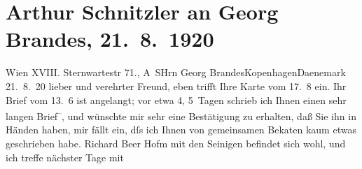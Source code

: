 

         
         \renewcommand{\erwaehntePersonen}{Personen: Richard Beer-Hofmann, Georg Brandes, Hugo von Hofmannsthal, Felix Salten}
         \renewcommand{\erwaehnteOrte}{Orte: Bad Aussee, Dänemark, Kopenhagen, Sternwartestraße, Wien, XVIII., Währing}
         \renewcommand{\erwaehnteWerke}{}
               \section[Arthur Schnitzler an Georg Brandes, 21. 8. 1920]{ Arthur Schnitzler an Georg Brandes, 21. 8. 1920}\nopagebreak{}\rehead{ }\begin{ledgroupsized}[t]{13cm}\normalsize\beginnumbering \toendnotes[C]{\smallbreak\pagebreak[2]} 
\pstart{}{\pb}Wien XVIII. Sternwartestr 71., A S\pend{}{\bigskip}\pstart{}Hrn Georg Brandes\pend{}\pstart{}Kopenhagen\pend{}\pstart{}Daenemark\pend{}{\bigskip}\pstart
           \raggedleft{}{\pb}21. 8. 20\pend
           \pstart
           lieber und verehrter Freund, eben trifft Ihre Karte vom
                  17. 8 ein. Ihr Brief vom 13. 6 ist angelangt; vor etwa
               4, 5 Tagen schrieb ich Ihnen einen sehr langen Brief\substVorne{}\textsuperscript{–}\substDazwischen{},\substHinten{} und wünschte mir sehr eine Bestätigung zu erhalten, daß Sie ihn in Händen
               haben, mir fällt ein, dſs ich Ihnen von gemeinsamen Beka{\geminationn}ten kaum etwas geschrieben habe. Richard Beer
                  Hofm mit den Seinigen befindet sich wohl, und ich treffe nächster Tage mit

\end{ledgroupsized}
